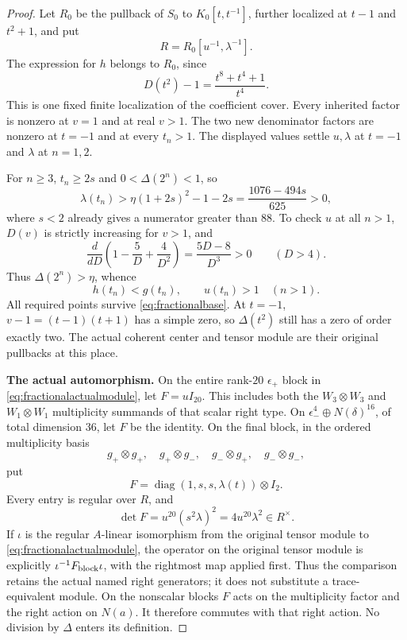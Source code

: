 \begin{proof}
Let $R_0$ be the pullback of $S_0$ to $K_0[t,t^{-1}]$,
further localized at $t-1$ and $t^2+1$, and put
\begin{equation}\label{eq:fractionalbase}
 R=R_0[u^{-1},\lambda^{-1}].
\end{equation}
The expression for $h$ belongs to $R_0$, since
\[
 D(t^2)-1=\frac{t^8+t^4+1}{t^4}.
\]
This is one fixed finite localization of the coefficient
cover. Every inherited factor is nonzero at $v=1$
and at real $v>1$. The two new denominator factors
are nonzero at $t=-1$ and at every $t_n>1$.
The displayed values settle $u,\lambda$ at $t=-1$
and $\lambda$ at $n=1,2$.

For $n\ge3$, $t_n\ge2s$ and $0<\Delta(2^n)<1$, so
\[
 \lambda(t_n)>
 \eta(1+2s)^2-1-2s
 =\frac{1076-494s}{625}>0,
\]
where $s<2$ already gives a numerator greater than $88$.
To check $u$ at all $n>1$, $D(v)$ is strictly increasing
for $v>1$, and
\[
 \frac{d}{dD}\left(1-\frac5D+\frac4{D^2}\right)
      =\frac{5D-8}{D^3}>0\qquad(D>4).
\]
Thus $\Delta(2^n)>\eta$, whence
\begin{equation}\label{eq:fractionalmonotonicity}
 h(t_n)<g(t_n),\qquad u(t_n)>1\quad(n>1).
\end{equation}
All required points survive \eqref{eq:fractionalbase}.
At $t=-1$, $v-1=(t-1)(t+1)$ has a simple zero,
so $\Delta(t^2)$ still has a zero of order exactly two.
The actual coherent center and tensor module are
their original pullbacks at this place.

\par\smallskip\noindent\textbf{The actual automorphism.}\quad
On the entire rank-$20$ $\epsilon_+$ block in
\eqref{eq:fractionalactualmodule}, let $F=uI_{20}$.
This includes both the $W_3\otimes W_3$ and
$W_1\otimes W_1$ multiplicity summands of that scalar
right type.
On $\epsilon_-^4\oplus N(\delta)^{16}$, of total
dimension $36$, let $F$ be the identity.
On the final block, in the ordered multiplicity basis
\[
 g_+\otimes g_+,\quad g_+\otimes g_-,\quad
 g_-\otimes g_+,\quad g_-\otimes g_-,
\]
put
\begin{equation}\label{eq:fractionaloperator}
 F=\operatorname{diag}(1,s,s,\lambda(t))\otimes I_2.
\end{equation}
Every entry is regular over $R$, and
\[
 \det F=u^{20}(s^2\lambda)^2=4u^{20}\lambda^2
          \in R^\times.
\]
If $\iota$ is the regular $A$-linear isomorphism
from the original tensor module to
\eqref{eq:fractionalactualmodule}, the operator on the
original tensor module is explicitly
$\iota^{-1}F_{\rm block}\iota$, with the rightmost map
applied first.
Thus the comparison retains the actual named right
generators; it does not substitute a trace-equivalent
module. On the nonscalar blocks $F$ acts on the
multiplicity factor and the right action on $N(a)$.
It therefore commutes with that right action.
No division by $\Delta$ enters its definition.


\end{proof}
